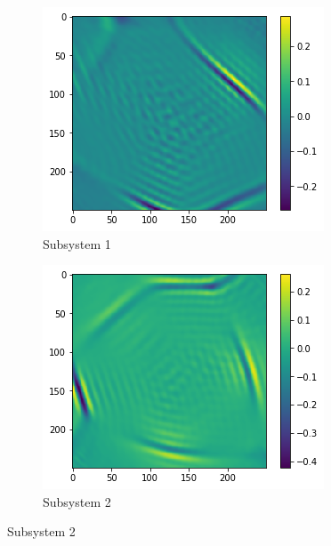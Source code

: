 \documentclass[12pt,a4paper]{article}
\begin{document}
\begin{figure}[!ht]
        \captionsetup[subfigure]{labelformat=empty}
        \centering
        \begin{subfigure}{0.4\linewidth}
                \includegraphics[width=\linewidth]{Neutral_ChargedEP_1}
                \caption{Subsystem 1}
        \end{subfigure}
        \begin{subfigure}{0.4\linewidth}
                \includegraphics[width=\linewidth]{Neutral_ChargedEP_2}
                \caption{Subsystem 2}
        \end{subfigure}

\end{figure}
\end{document}
